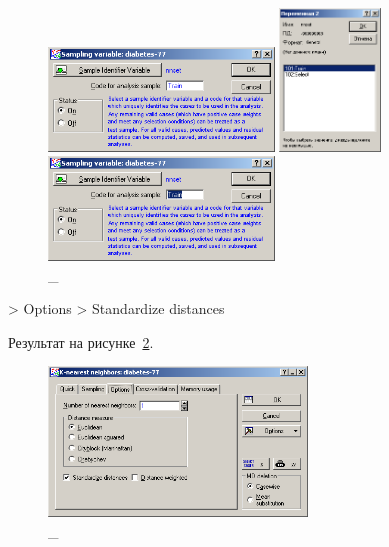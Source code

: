 \begin{figure}[!h]
  \centering

  \begin{minipage}{0.32\textwidth}
    \centering

    \includegraphics[width=6cm]
    {inc/v5_8.PNG}

    \caption{\_}

    \label{fig:8}
  \end{minipage}
  \begin{minipage}{0.32\textwidth}
    \centering

    \includegraphics[height=3.8cm]
    {inc/v5_9.PNG}

    \caption{\_}

    \label{fig:9}
  \end{minipage}
  \begin{minipage}{0.32\textwidth}
    \centering

    \includegraphics[width=6cm]
    {inc/v5_10.PNG}

    \caption{\_}

    \label{fig:10}
  \end{minipage}
\end{figure}

\newpage

> Options > Standardize distances

Результат на рисунке~\ref{fig:11_1}.

\begin{figure}[!h]
  \centering

  \includegraphics[height=4cm]
  {inc/v5_11.PNG}

  \caption{\_}

  \label{fig:11_1}
\end{figure}

